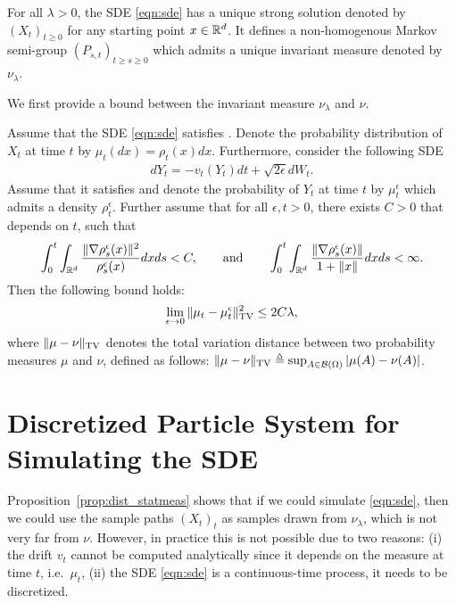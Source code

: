 \begin{assumption}
\label{asmp:sde_ergo}
For all $\lambda >0$, the SDE  \eqref{eqn:sde} has a unique strong solution denoted by $(X_t)_{t\geq 0}$ for any starting point $x \in \mathbb{R}^d$. It defines a non-homogenous Markov semi-group $(P_{s,t})_{t\geq s\geq 0}$ which admits a unique invariant measure denoted by $\nu_\lambda$. 
\end{assumption}



We first provide a bound between the invariant measure $\nu_\lambda$ and $\nu$.

\begin{prop}
\label{prop:dist_statmeas}
Assume that the SDE \eqref{eqn:sde} satisfies . Denote the probability distribution of $X_t$ at time $t$ by $\mu_t(dx) = \rho_t (x) dx$. Furthermore, consider the following SDE
\begin{align}
d Y_t = - v_t(Y_t) dt + \sqrt{2 \epsilon } d W_t. \label{eqn:sde_eps}
\end{align}
Assume that it satisfies  and denote the probability of $Y_t$ at time $t$ by $\mu^\epsilon_t$ which admits a density $\rho^\epsilon_t$. Further assume that for all $\epsilon,t>0$, there exists $C >0$ that depends on $t$, such that
\begin{align}
\int_{0}^t \int_{\mathbb{R}^d} \frac{\|\nabla \rho^\epsilon_s(x) \|^2}{\rho^\epsilon_s(x)} dx ds <C, \qquad \text{and} \qquad \int_{0}^t \int_{\mathbb{R}^d}  \frac{\|\nabla \rho^\epsilon_s(x)\|}{1+\|x\|} dx ds <\infty.
\end{align}
Then the following bound holds:
\begin{align}
\lim_{\epsilon \rightarrow 0} \| \mu_t - \mu^\epsilon_t \|_{\textnormal{TV}}^2 \leq 2 C \lambda,
\end{align}
where $\|\mu-\nu\|_{\textnormal{TV}}$ denotes the total variation distance between two probability measures $\mu$ and $\nu$, defined as follows: $\|\mu-\nu\|_{\textnormal{TV}}\triangleq \sup_{A \in {\cal B}(\Omega)} |\mu(A) -\nu(A) |$.
\end{prop}

\section{Discretized Particle System for Simulating the SDE}

Proposition~\ref{prop:dist_statmeas} shows that if we could simulate \eqref{eqn:sde}, then we could use the sample paths $(X_t)_t$ as
samples drawn from $\nu_\lambda$, which is not very far from $\nu$. However, in practice this is not possible due to two reasons: (i) the drift $v_t$ cannot be computed analytically since it depends on the measure at time $t$, i.e.\ $\mu_t$, (ii) the SDE \eqref{eqn:sde} is a continuous-time process, it needs to be discretized.  

